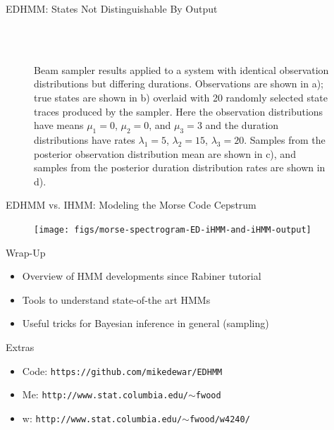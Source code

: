 \documentclass[xcolor=dvipsnames]{beamer}
\begin{document}
\begin{frame}[t]{EDHMM:  States Not Distinguishable By Output}
\setcounter{subfigure}{0}
\begin{figure}
     \\
     \\
    \caption{Beam sampler results applied to a system with identical observation distributions but differing durations. Observations are shown in a); true states are shown in b) overlaid with 20 randomly selected state traces produced by the sampler. Here the observation distributions have means $\mu_1 = 0$, $\mu_2 = 0$, and $\mu_3 = 3$ and the duration distributions have rates $\lambda_1 = 5$, $\lambda_2 = 15$, $\lambda_3 = 20$. Samples from the posterior observation distribution mean are shown in c), and samples from the posterior duration distribution rates are shown in d).}
    \label{fig:experiment2_results}
\end{figure}
\end{frame}

\begin{frame}[t]{EDHMM vs. IHMM:  Modeling the Morse Code Cepstrum}
	\begin{figure}[t]
		\begin{center}
			\texttt{[image: figs/morse-spectrogram-ED-iHMM-and-iHMM-output]}
		\end{center}
	\end{figure}
\end{frame}


\begin{frame}[t]{Wrap-Up}
\begin{itemize}
\item Overview of HMM developments since Rabiner tutorial
\item Tools to understand state-of-the art HMMs
\item Useful tricks for Bayesian inference in general (sampling)
\end{itemize}

Extras

\begin{itemize}
\item Code: \texttt{https://github.com/mikedewar/EDHMM}
\item Me: \texttt{http://www.stat.columbia.edu/$\sim$fwood}
\item  w: \texttt{http://www.stat.columbia.edu/$\sim$fwood/w4240/}

\end{itemize}

\end{frame}
\end{document}
